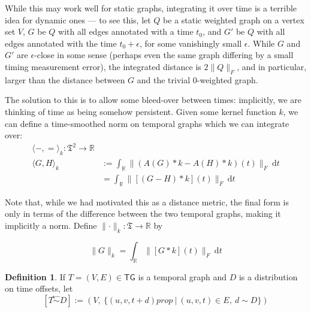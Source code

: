 \documentclass{article}
\theoremstyle{definition}
\newtheorem{defn}{Definition}
\newcommand{\noised}[2]{\left[#1 \stackrel{\gets}{\sim } #2\right]}
\begin{document}
	While this may work well for static graphs, integrating it over time is a terrible idea for dynamic ones --- to see this, let $Q$ be a static weighted graph on a vertex set $V$, $G$ be $Q$ with all edges annotated with a time $t_0$, and $G'$ be $Q$ with all edges annotated with the time $t_0 + \epsilon$, for some vanishingly small $\epsilon$. While $G$ and $G'$ are $\epsilon$-close in some sense (perhaps even the same graph differing by a small timing measurement error), the integrated distance is $2\lVert Q \rVert_F$, and in particular, larger than the distance between $G$ and the trivial 0-weighted graph.
	
	The solution to this is to allow some bleed-over between times: implicitly, we are thinking of time as being somehow persistent. Given some kernel function $k$, we can define a time-smoothed norm on temporal graphs which we can integrate over:	
	\begin{align*}
		\Big\langle -,= \Big\rangle_k: \mathfrak T^2 \to \mathbb R \\
		\Big\langle G, H \Big\rangle_k &:= \int_{\mathbb R}\Big\lVert (A(G) \ast k - A(H) \ast k)(t) \Big\rVert_F~\mathrm d t\\
		&= \int_{\mathbb R} \Big\lVert [(G - H) * k](t) \Big\rVert_F~\mathrm d t 
	\end{align*} 
	
	Note that, while we had motivated this as a distance metric, the final form is only in terms of the difference between the two temporal graphs, making it implicitly a norm. Define $\lVert \cdot \rVert_k : \mathfrak T \to \mathbb R$ by
	
	\begin{equation*}
		\lVert G \rVert_k = \int_{\mathbb R} \Big\lVert [G * k](t) \Big\rVert_F~\mathrm d t 
	\end{equation*}
	\[ \]
	 
	\begin{defn}
		If $T = (V,E) \in \mathsf{TG}$ is a temporal graph and $D$ is a distribution on time offsets, let 
		\[ \noised T D := \left(V,~\Big\{ (u,v,t +d) prop~\Big|~ (u,v,t) \in E,~d \sim D \Big\}\right) \]
	\end{defn}
	
\end{document}
